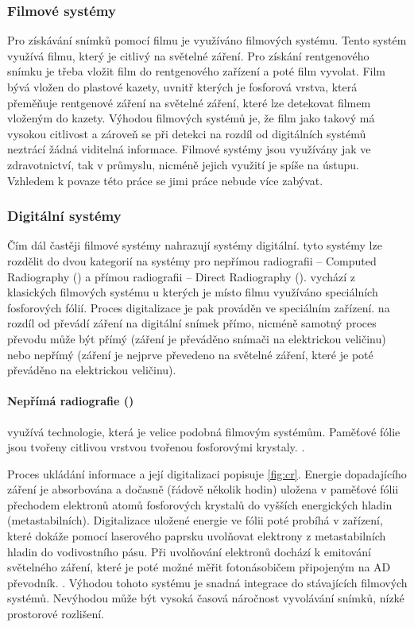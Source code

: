 \subsubsection{Filmové systémy}
Pro získávání snímků pomocí filmu je využíváno filmových systému. Tento systém využívá filmu, který je citlivý na světelné záření. Pro získání rentgenového snímku je třeba vložit film do rentgenového zařízení a poté film vyvolat. Film bývá vložen do plastové kazety, uvnitř kterých je fosforová vrstva, která přeměňuje rentgenové záření na světelné záření, které lze detekovat filmem vloženým do kazety. Výhodou filmových systémů je, že film jako takový má vysokou citlivost a zároveň se při detekci na rozdíl od digitálních systémů neztrácí žádná viditelná informace. \cite[str.~155]{Diagnostic-Radiology-Physics} Filmové systémy jsou využívány jak ve zdravotnictví, tak v průmyslu, nicméně jejich využití je spíše na ústupu. Vzhledem k povaze této práce se jimi práce nebude více zabývat.

\subsubsection{Digitální systémy}
Čím dál častěji filmové systémy nahrazují systémy digitální. tyto systémy lze rozdělit do dvou kategorií na systémy pro nepřímou radiografii -- Computed Radiography () a přímou radiografii -- Direct Radiography  ().  vychází z klasických filmových systému u kterých je místo filmu využíváno speciálních fosforových fólií. Proces digitalizace je pak prováděn ve speciálním zařízení.
 na rozdíl od  převádí záření na digitální snímek přímo, nicméně samotný proces převodu může být přímý (záření je převáděno snímači na elektrickou veličinu) nebo nepřímý (záření je nejprve převedeno na světelné záření, které je poté převáděno na elektrickou veličinu). \cite[str.~676]{Advances-in-Digital-Radiography}

\paragraph{Nepřímá radiografie ()}
využívá technologie, která je velice podobná filmovým systémům. Paměťové fólie jsou tvořeny citlivou vrstvou tvořenou fosforovými krystaly. \cite[str.~676]{Advances-in-Digital-Radiography}. 

Proces ukládání informace a její digitalizaci popisuje \cref{fig:cr}. Energie dopadajícího záření je absorbována a dočasně (řádově několik hodin) uložena v paměťové fólii přechodem elektronů atomů fosforových krystalů do vyšších energických hladin (metastabilních). Digitalizace uložené energie ve fólii poté probíhá v zařízení, které dokáže pomocí laserového paprsku uvolňovat elektrony z metastabilních hladin do vodivostního pásu. Při uvolňování elektronů dochází k emitování světelného záření, které je poté možné měřit fotonásobičem připojeným na AD převodník. \cite[str.~677]{Advances-in-Digital-Radiography}. Výhodou tohoto systému je snadná integrace do stávajících filmových systémů. Nevýhodou může být vysoká časová náročnost vyvolávání snímků, nízké prostorové rozlišení. \cite[str~209]{Diagnostic-Radiology}


